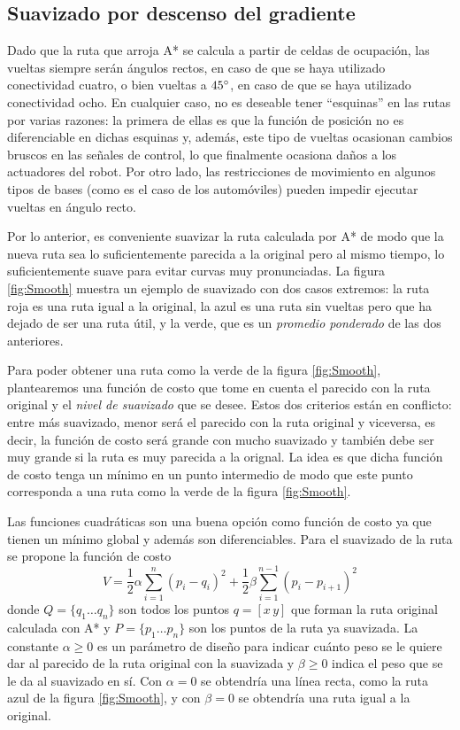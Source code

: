 \documentclass[letterpaper,12pt]{article}
\begin{document}
\subsection{Suavizado por descenso del gradiente}
Dado que la ruta que arroja A* se calcula a partir de celdas de ocupación, las vueltas siempre serán ángulos rectos, en caso de que se haya utilizado conectividad cuatro, o bien vueltas a $45\degree$, en caso de que se haya utilizado conectividad ocho. En cualquier caso, no es deseable tener ``esquinas'' en las rutas por varias razones: la primera de ellas es que la función de posición no es diferenciable en dichas esquinas y, además, este tipo de vueltas ocasionan cambios bruscos en las señales de control, lo que finalmente ocasiona daños a los actuadores del robot. Por otro lado, las restricciones de movimiento en algunos tipos de bases (como es el caso de los automóviles) pueden impedir ejecutar vueltas en ángulo recto.

Por lo anterior, es conveniente suavizar la ruta calculada por A* de modo que la nueva ruta sea lo suficientemente parecida a la original pero al mismo tiempo, lo suficientemente suave para evitar curvas muy pronunciadas. La figura \ref{fig:Smooth} muestra un ejemplo de suavizado con dos casos extremos: la ruta roja es una ruta igual a la original, la azul es una ruta sin vueltas pero que ha dejado de ser una ruta útil, y la verde, que es un \textit{promedio ponderado} de las dos anteriores. 

Para poder obtener una ruta como la verde de la figura \ref{fig:Smooth}, plantearemos una función de costo que tome en cuenta el parecido con la ruta original y el \textit{nivel de suavizado} que se desee. Estos dos criterios están en conflicto: entre más suavizado, menor será el parecido con la ruta original y viceversa, es decir, la función de costo será grande con mucho suavizado y también debe ser muy grande si la ruta es muy parecida a la orignal. La idea es que dicha función de costo tenga un mínimo en un punto intermedio de modo que este punto corresponda a una ruta como la verde de la figura \ref{fig:Smooth}. 

Las funciones cuadráticas son una buena opción como función de costo ya que tienen un mínimo global y además son diferenciables. Para el suavizado de la ruta se propone la función de costo
\begin{equation}
V = \frac{1}{2}\alpha\sum_{i=1}^{n}\left(p_i - q_i\right)^2 + \frac{1}{2}\beta\sum_{i=1}^{n-1}\left(p_i - p_{i+1}\right)^2
\label{eq:Cost}
\end{equation}
donde $Q = \{q_1\dots q_n\}$ son todos los puntos $q = [x\,y]$ que forman la ruta original calculada con A* y $P=\{p_1\dots p_n\}$ son los puntos de la ruta ya suavizada. La constante $\alpha \geq 0$ es un parámetro de diseño para indicar cuánto peso se le quiere dar al parecido de la ruta original con la suavizada y $\beta \geq 0$ indica el peso que se le da al suavizado en sí. Con $\alpha = 0$ se obtendría una línea recta, como la ruta azul de la figura \ref{fig:Smooth}, y con $\beta = 0$ se obtendría una ruta igual a la original.
\end{document}
